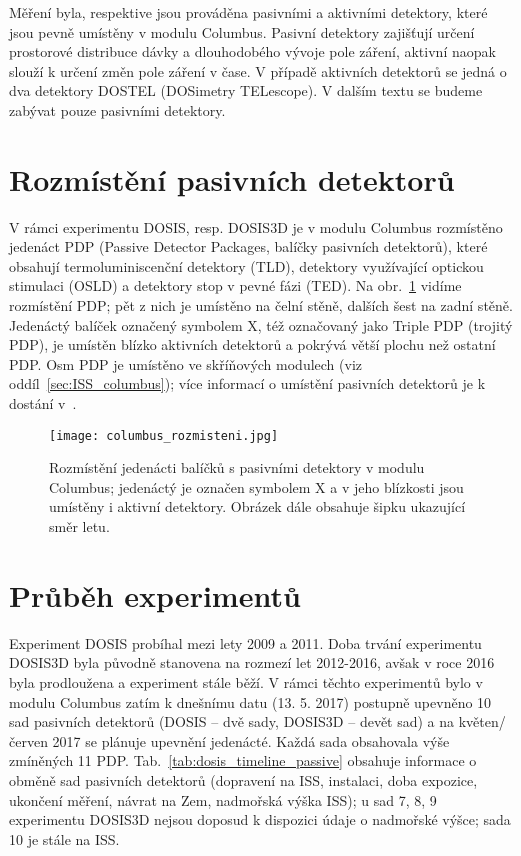 Měření byla, respektive jsou prováděna pasivními a aktivními detektory, které jsou pevně umístěny v modulu Columbus. Pasivní detektory zajišťují určení prostorové distribuce dávky a dlouhodobého vývoje pole záření, aktivní naopak slouží k určení změn pole záření v čase. V případě aktivních detektorů se jedná o dva detektory DOSTEL (DOSimetry TELescope). V dalším textu se budeme zabývat pouze pasivními detektory.

\section{Rozmístění pasivních detektorů}
V rámci experimentu DOSIS, resp. DOSIS3D je v modulu Columbus rozmístěno jedenáct PDP (Passive Detector Packages, balíčky pasivních detektorů), které obsahují termoluminiscenční detektory (TLD), detektory využívající optickou stimulaci (OSLD) a detektory stop v pevné fázi (TED). Na obr.~\ref{fig:columbus_rozmisteni} vidíme rozmístění PDP; pět z nich je umístěno na čelní stěně, dalších šest na zadní stěně. Jedenáctý balíček označený symbolem X, též označovaný jako Triple PDP (trojitý PDP), je umístěn blízko aktivních detektorů a pokrývá větší plochu než ostatní PDP. Osm PDP je umístěno ve skříňových modulech (viz oddíl~\ref{sec:ISS_columbus}); více informací o umístění pasivních detektorů je k dostání v~\cite{dosis}. %
\begin{figure}[ht]
  \centering
  \texttt{[image: columbus\_rozmisteni.jpg]}
  \caption{Rozmístění jedenácti balíčků s pasivními detektory v modulu Columbus; jedenáctý je označen symbolem X a v jeho blízkosti jsou umístěny i aktivní detektory. Obrázek dále obsahuje šipku ukazující směr letu. \cite{dosis}}
  \label{fig:columbus_rozmisteni}
\end{figure}

\section{Průběh experimentů}%
Experiment DOSIS probíhal mezi lety 2009 a 2011. Doba trvání experimentu DOSIS3D byla původně stanovena na rozmezí let 2012-2016, avšak v roce 2016 byla prodloužena a experiment stále běží. V rámci těchto experimentů bylo v modulu Columbus zatím k dnešnímu datu (13. 5. 2017) postupně upevněno 10 sad pasivních detektorů (DOSIS -- dvě sady, DOSIS3D -- devět sad) a na květen/červen 2017 se plánuje upevnění jedenácté. Každá sada obsahovala výše zmíněných 11 PDP. Tab.~\ref{tab:dosis_timeline_passive} obsahuje informace o obměně sad pasivních detektorů (dopravení na ISS, instalaci, doba expozice, ukončení měření,
návrat na Zem, nadmořská výška ISS); u sad 7, 8, 9 experimentu DOSIS3D nejsou doposud k dispozici údaje o nadmořské výšce; sada 10 je stále na ISS. 

